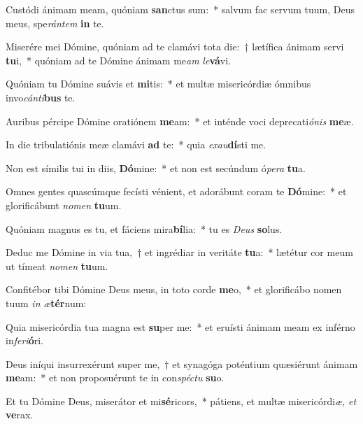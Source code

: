 \item Custódi ánimam meam, quóniam \textbf{san}ctus sum:~* salvum fac servum tuum, Deus meus, spe\hspace{0.03em}\textit{rántem} \textbf{in} te.
\item Miserére mei Dómine, quóniam ad te clamávi tota die:~† lætífica ánimam servi \textbf{tu}i,~* quóniam ad te Dómine ánimam me\hspace{0.03em}\textit{am} \textit{le}\hspace{0.01em}\textbf{vá}vi.
\item Quóniam tu Dómine suávis et \textbf{mi}tis:~* et multæ misericórdiæ ómnibus invo\hspace{0.03em}\textit{cánti}\hspace{0.01em}\textbf{bus} te.
\item Auribus pércipe Dómine oratiónem \textbf{me}am:~* et inténde voci deprecati\hspace*{0.03em}\textit{ónis} \textbf{me}æ.
\item In die tribulatiónis meæ clamávi \textbf{ad} te:~* quia \textit{exau}\textbf{dí}sti me.
\item Non est símilis tui in diis, \textbf{Dó}mine:~* et non est secúndum ó\textit{pera} \textbf{tu}a.
\item Omnes gentes quascúmque fecísti vénient, et adorábunt coram te \textbf{Dó}mine:~* et glorificábunt \textit{nomen} \textbf{tu}um.
\item Quóniam magnus es tu, et fáciens mira\textbf{bí}lia:~* tu es \textit{Deus} \textbf{so}lus.
\item Deduc me Dómine in via tua,~† et ingrédiar in veritáte \textbf{tu}a:~* lætétur cor meum ut tímeat \textit{nomen} \textbf{tu}um.
\item Confitébor tibi Dómine Deus meus, in toto corde \textbf{me}o,~* et glorificábo nomen tuum \textit{in} \textit{æ}\textbf{tér}num:
\item Quia misericórdia tua magna est \textbf{su}per me:~* et eruísti ánimam meam ex inférno in\textit{feri}\textbf{ó}ri.
\item Deus iníqui insurrexérunt super me,~† et synagóga poténtium quæsiérunt ánimam \textbf{me}am:~* et non proposuérunt te in con\hspace{0.03em}\textit{spéctu} \textbf{su}o.
\item Et tu Dómine Deus, miserátor et mi\textbf{sé}ricors,~* pátiens, et multæ misericórdi\hspace{0.03em}\textit{æ,} \textit{et} \textbf{ve}rax.
